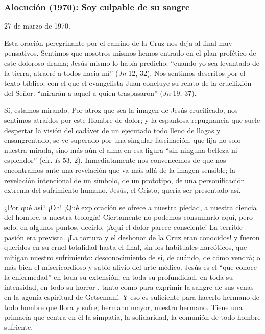 			\subsubsection{Alocución (1970): Soy culpable de su sangre}
			
			\begin{referencia}27 de marzo de 1970. \end{referencia}
			
			\begin{body}Esta oración peregrinante por el camino de la Cruz nos deja al final muy pensativos. Sentimos que nosotros mismos hemos entrado en el plan profético de este doloroso drama; Jesús mismo lo había predicho: “cuando yo sea levantado de la tierra, atraeré a todos hacia mí” (\textit{Jn }12, 32). Nos sentimos descritos por el texto bíblico, con el que el evangelista Juan concluye su relato de la crucifixión del Señor: “mirarán a aquel a quien traspasaron” (\textit{Jn }19, 37). \end{body}
			
			\begin{body}Sí, estamos mirando. Por atroz que sea la imagen de Jesús crucificado, nos sentimos atraídos por este Hombre de dolor; y la espantosa repugnancia que suele despertar la visión del cadáver de un ejecutado todo lleno de llagas y ensangrentado, se ve superado por una singular fascinación, que fija no solo nuestra mirada, sino más aún el alma en esa figura “sin ninguna belleza ni esplendor” (cfr. \textit{Is} 53, 2). Inmediatamente nos convencemos de que nos encontramos ante una revelación que va más allá de la imagen sensible; la revelación intencional de un símbolo, de un prototipo, de una personificación extrema del sufrimiento humano. Jesús, el Cristo, quería ser presentado así. \end{body}
			
			\begin{body}¿Por qué así? ¡Oh! ¡Qué exploración se ofrece a nuestra piedad, a nuestra ciencia del hombre, a nuestra teología! Ciertamente no podemos consumarlo aquí, pero solo, en algunos puntos, decirlo. ¡Aquí el dolor parece consciente! La terrible pasión era prevista. ¡La tortura y el deshonor de la Cruz eran conocidos! y fueron queridos en su cruel totalidad hasta el final, sin los habituales narcóticos, que mitigan nuestro sufrimiento: desconocimiento de sí, de cuándo, de cómo vendrá; o más bien el misericordioso y sabio alivio del arte médico. Jesús es el “que conoce la enfermedad” en toda su extensión, en toda su profundidad, en toda su intensidad, en todo su horror , tanto como para exprimir la sangre de sus venas en la agonía espiritual de Getsemaní. Y eso es suficiente para hacerlo hermano de todo hombre que llora y sufre; hermano mayor, nuestro hermano. Tiene una primacía que centra en él la simpatía, la solidaridad, la comunión de todo hombre sufriente. \end{body}
			
